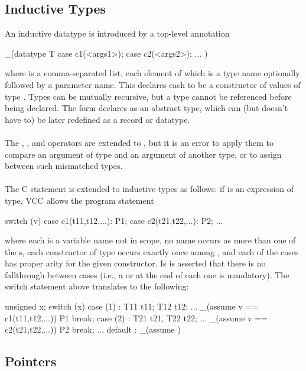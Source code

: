 \documentclass[preprint,nocopyrightspace]{sigplanconf}
\begin{document}
{{\subsection{Inductive Types}
An inductive datatype is introduced by a top-level annotation
\begin{VCC}
  _(datatype T {
    case c1(<args1>);
    case c2(<args2>);
    ...
  })
\end{VCC}
where  is a comma-separated list, each element of which is
a type name optionally followed by a parameter name. This
declares each  to be a constructor of values of
type . Types can be mutually recursive, but a type cannot be referenced
before being declared. The form  declares  as an
abstract type, which can (but doesn't have to) be later redefined as
a record or datatype.
\\\\
The \vcc{==}, \vcc{!=}, and \vcc{=} operators are extended to , but
it is an error to apply them to compare an argument of type 
and an argument of another type, or to assign between such mismatched types.
\\\\
The C  statement is extended to inductive types as
follows: if  is an expression of type, VCC allows the program statement 
\begin{VCC}
switch (v) {
  case c1(t11,t12,...): P1;
  case c2(t21,t22,...): P2;
  ...
}
\end{VCC}
where each  is a variable name not in scope, no name occurs
as more than one of the s, each constructor of type 
occurs exactly once among , and each of the cases has
proper arity for the given constructor. Is is asserted that there is
no fallthrough between cases (i.e., a  or  at the end of each one
is mandatory). The switch statement above translates to
the following:
\begin{VCC}
{
  unsigned x;
  switch (x) {
    case (1) : {
      T11 t11; T12 t12; ...
      _(assume v == c1(t11,t12,...))
      { P1 }
      break;
    } case (2) : {
      T21 t21, T22 t22; ...
      _(assume v == c2(t21,t22,...))
      { P2 }
      break;
    } ...
    default : { _(assume \false) }
  }
}
\end{VCC}

\subsection{Pointers}

}}
\end{document}
